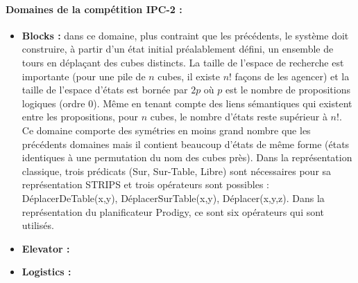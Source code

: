 \paragraph*{Domaines de la compétition IPC-2 :}
\begin{itemize}
\item \textbf{Blocks :} dans ce domaine, plus contraint que les précédents, le système doit construire, à partir d'un état initial préalablement défini, un ensemble de tours en déplaçant des cubes distincts. La taille de l'espace de recherche est importante (pour une pile de $n$ cubes, il existe $n!$ façons de les agencer) et la taille de l'espace d'états est bornée par $2p$ où $p$ est le nombre de propositions logiques (ordre 0). Même en tenant compte des liens sémantiques qui existent entre les propositions, pour $n$ cubes, le nombre d'états reste supérieur à $n!$. Ce domaine comporte des symétries en moins grand nombre que les précédents domaines mais il contient beaucoup d'états de même forme (états identiques à une permutation du nom des cubes près). Dans la représentation classique, trois prédicats (Sur, Sur-Table, Libre) sont nécessaires pour sa représentation STRIPS et trois opérateurs sont possibles : DéplacerDeTable(x,y), DéplacerSurTable(x,y), Déplacer(x,y,z). Dans la représentation du planificateur Prodigy, ce sont six opérateurs qui sont utilisés.
\item \textbf{Elevator :}
\item \textbf{Logistics :}
\end{itemize}

